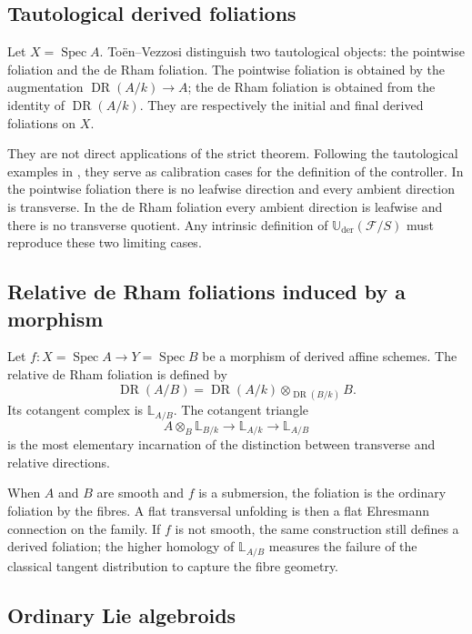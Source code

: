 \documentclass[11pt,reqno,a4paper,dvipsnames,x11names]{amsart}
\numberwithin{equation}{section}
\theoremstyle{plain}
\theoremstyle{definition}
\theoremstyle{remark}
\DeclareMathOperator{\Spec}{Spec}
\DeclareMathOperator{\DR}{DR}
\newcommand{\kk}{k}
\newcommand{\cF}{\mathcal F}
\newcommand{\Uder}{\mathbb U_{\mathrm{der}}}
\newcommand{\bbL}{\mathbb L}
\newcommand{\from}{\colon}
\begin{document}
\subsection{Tautological derived foliations}

Let \(X=\Spec A\). To\"en--Vezzosi distinguish two tautological objects: the pointwise foliation and the de Rham foliation. The pointwise foliation is obtained by the augmentation \(\DR(A/\kk)\to A\); the de Rham foliation is obtained from the identity of \(\DR(A/\kk)\). They are respectively the initial and final derived foliations on \(X\).

They are not direct applications of the strict theorem. Following the tautological examples in \cite[Section~2.1]{TV}, they serve as calibration cases for the definition of the controller. In the pointwise foliation there is no leafwise direction and every ambient direction is transverse. In the de Rham foliation every ambient direction is leafwise and there is no transverse quotient. Any intrinsic definition of \(\Uder(\cF/S)\) must reproduce these two limiting cases.

\subsection{Relative de Rham foliations induced by a morphism}

Let \(f\from X=\Spec A\to Y=\Spec B\) be a morphism of derived affine schemes. The relative de Rham foliation is defined by
\[
 \DR(A/B)=\DR(A/\kk)\otimes_{\DR(B/\kk)}B.
\]
Its cotangent complex is \(\bbL_{A/B}\). The cotangent triangle
\[
 A\otimes_B\bbL_{B/\kk}\longrightarrow \bbL_{A/\kk}\longrightarrow \bbL_{A/B}
\]
is the most elementary incarnation of the distinction between transverse and relative directions.

When \(A\) and \(B\) are smooth and \(f\) is a submersion, the foliation is the ordinary foliation by the fibres. A flat transversal unfolding is then a flat Ehresmann connection on the family. If \(f\) is not smooth, the same construction still defines a derived foliation; the higher homology of \(\bbL_{A/B}\) measures the failure of the classical tangent distribution to capture the fibre geometry.

\subsection{Ordinary Lie algebroids}
\end{document}
